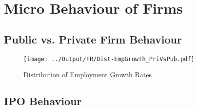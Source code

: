 \documentclass[12pt,notitlepage]{article}
\begin{document}


\FloatBarrier
\section{Micro Behaviour of Firms} %
\label{sec:micro_behaviour_of_firms}


\FloatBarrier
\subsection{Public vs. Private Firm Behaviour} %
\label{sec:public_vs_private_firm_behaviour}
\FloatBarrier



\begin{figure}[!htpb]
\centering
\caption{Distribution of Employment Growth Rates}
 \texttt{[image: ../Output/FR/Dist-EmpGrowth\_PriVsPub.pdf]}
\end{figure}






\FloatBarrier
\subsection{IPO Behaviour} %
\label{sec:ipo_behaviour}
\FloatBarrier


\begin{table}[!htpb]
\caption{Number of data points x years after an IPO}
    \begin{center}
    \end{center}
\end{table}
\end{document}
